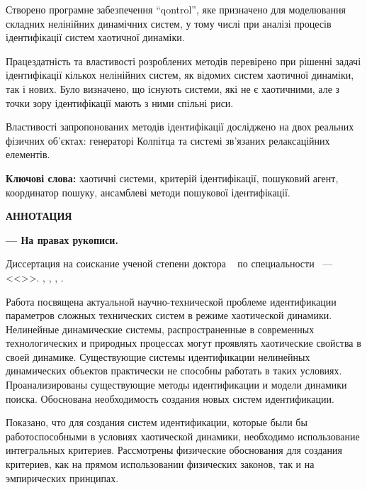 \documentclass[a4paper,13pt]{atuaref}
\newcommand{\xsect}[1]{\vspace{0.15ex}\begin{center}\textbf{#1}\end{center}\vspace{4pt}\penalty10000}
\begin{document}
Створено програмне забезпечення ``qontrol'',
яке призначено для моделювання складних нелінійних динамічних
систем, у тому числі при аналізі процесів ідентифікації систем хаотичної динаміки.

Працездатність та властивості розроблених методів перевірено при
рішенні задачі ідентифікації кількох нелінійних систем,
як відомих систем хаотичної динаміки, так і нових.
Було визначено, що існують системи, які не є хаотичними, але
з точки зору ідентифікації мають з ними спільні риси.

Властивості запропонованих методів ідентифікації досліджено
на двох реальних фізичних об'єктах:
генераторі Колпітца та системі зв'язаних релаксаційних елементів.



\textbf{Ключові слова:}
хаотичні системи,
критерій ідентифікації,
пошуковий агент,
координатор пошуку,
ансамблеві методи пошукової ідентифікації.

\xsect{АННОТАЦИЯ}

\textbf{\dissauthorRu}
\textbf{\booknameRu}
\textbf{--- На правах рукописи.}

Диссертация на соискание ученой степени
доктора
\dissScopeRu\ {}
по специальности
\dissSpecId\ --- <<\dissSpecRu>>.
\institutionRu, \belongRu, \cityRu, \bookyear.

Работа посвящена актуальной научно-технической проблеме идентификации
параметров сложных технических систем в режиме хаотической динамики. Нелинейные
динамические системы, распространенные в современных технологических и
природных процессах могут проявлять хаотические свойства в своей динамике.
Существующие системы идентификации нелинейных динамических объектов практически
не способны работать в таких условиях.
%
Проанализированы существующие методы идентификации и модели динамики поиска.
Обоснована необходимость создания новых систем идентификации.

Показано, что для создания систем идентификации, которые были бы работоспособными
в условиях хаотической динамики, необходимо использование интегральных критериев.
Рассмотрены физические обоснования для создания критериев,
как на прямом использовании физических законов, так и на
эмпирических принципах.
\end{document}
